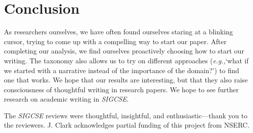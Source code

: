 \documentclass[sigconf]{acmart}
\newcommand{\eg}{\textit{e.g.,}\xspace}
\begin{document}
	\section{Conclusion}

	As researchers ourselves, we have often found ourselves staring at a blinking cursor, trying to come up with a compelling way to start our paper. After completing our analysis, we find ourselves proactively choosing how to start our writing. The taxonomy also allows us to try on different approaches (\eg `what if we started with a narrative instead of the importance of the domain?') to find one that works. We hope that our results are interesting, but that they also raise consciousness of thoughtful writing in research papers. We hope to see further research on academic writing in \textit{SIGCSE}.


	
\begin{acks} 

The \textit{SIGCSE} reviews were thoughtful, insightful, and enthusiastic---thank you to the reviewers. J. Clark acknowledges partial funding of this project from NSERC. 
\end{acks}


	
	
\end{document}
